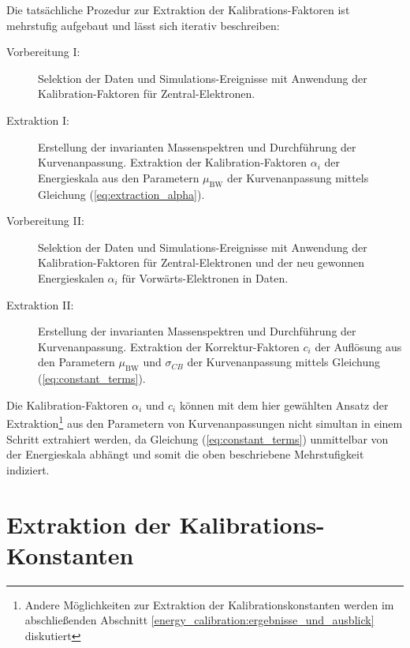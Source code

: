 Die tatsächliche Prozedur zur Extraktion der Kalibrations-Faktoren ist
mehrstufig aufgebaut und lässt sich iterativ beschreiben:
\begin{description}
    \item[Vorbereitung I:]
        Selektion der Daten und Simulations-Ereignisse mit Anwendung der
        Kalibration-Faktoren für Zentral-Elektronen.
    \item[Extraktion I:]
        Erstellung der invarianten Massenspektren und Durchführung der
        Kurvenanpassung. Extraktion der Kalibration-Faktoren $\alpha_i$ der
        Energieskala aus den Parametern $\mu_\text{BW}$ der Kurvenanpassung
        mittels Gleichung (\ref{eq:extraction_alpha}).
    \item[Vorbereitung II:]
        Selektion der Daten und Simulations-Ereignisse mit Anwendung der
        Kalibration-Faktoren für Zentral-Elektronen und der neu gewonnen
        Energieskalen $\alpha_i$ für Vorwärts-Elektronen in Daten.
    \item[Extraktion II:]
        Erstellung der invarianten Massenspektren und Durchführung der
        Kurvenanpassung. Extraktion der Korrektur-Faktoren $c_i$ der
        Auflösung aus den Parametern $\mu_\text{BW}$ und $\sigma_{CB}$ der
        Kurvenanpassung mittels Gleichung (\ref{eq:constant_terms}).
\end{description}
Die Kalibration-Faktoren $\alpha_i$ und $c_i$ können mit dem hier gewählten
Ansatz der Extraktion\footnote{Andere Möglichkeiten zur Extraktion der
Kalibrationskonstanten werden im abschließenden Abschnitt
\ref{energy_calibration:ergebnisse_und_ausblick} diskutiert} aus den Parametern
von Kurvenanpassungen nicht simultan in einem Schritt extrahiert werden, da
Gleichung (\ref{eq:constant_terms}) unmittelbar von der Energieskala abhängt
und somit die oben beschriebene Mehrstufigkeit indiziert.



%
\section{Extraktion der Kalibrations-Konstanten}
\label{energy_calibration:extraktion_der_kalibrations-konstanten}



